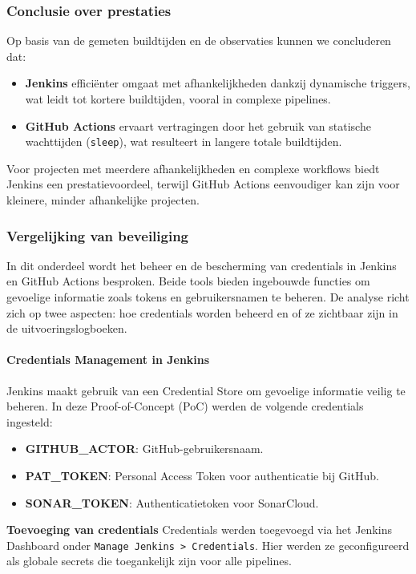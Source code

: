 \subsubsection{Conclusie over prestaties}
Op basis van de gemeten buildtijden en de observaties kunnen we concluderen dat:
\begin{itemize}
    \item \textbf{Jenkins} efficiënter omgaat met afhankelijkheden dankzij dynamische triggers, wat leidt tot kortere buildtijden, vooral in complexe pipelines.
    \item \textbf{GitHub Actions} ervaart vertragingen door het gebruik van statische wachttijden (\texttt{sleep}), wat resulteert in langere totale buildtijden.
\end{itemize}

Voor projecten met meerdere afhankelijkheden en complexe workflows biedt Jenkins een prestatievoordeel, terwijl GitHub Actions eenvoudiger kan zijn voor kleinere, minder afhankelijke projecten.

\subsubsection{Vergelijking van beveiliging}

In dit onderdeel wordt het beheer en de bescherming van credentials in Jenkins en GitHub Actions besproken. Beide tools bieden ingebouwde functies om gevoelige informatie zoals tokens en gebruikersnamen te beheren. De analyse richt zich op twee aspecten: hoe credentials worden beheerd en of ze zichtbaar zijn in de uitvoeringslogboeken.

\paragraph{Credentials Management in Jenkins}

Jenkins maakt gebruik van een Credential Store om gevoelige informatie veilig te beheren. In deze Proof-of-Concept (PoC) werden de volgende credentials ingesteld:
\begin{itemize}
    \item \textbf{GITHUB\_ACTOR}: GitHub-gebruikersnaam.
    \item \textbf{PAT\_TOKEN}: Personal Access Token voor authenticatie bij GitHub.
    \item \textbf{SONAR\_TOKEN}: Authenticatietoken voor SonarCloud.
\end{itemize}

\textbf{Toevoeging van credentials}  
Credentials werden toegevoegd via het Jenkins Dashboard onder \texttt{Manage Jenkins > Credentials}. Hier werden ze geconfigureerd als globale secrets die toegankelijk zijn voor alle pipelines.

